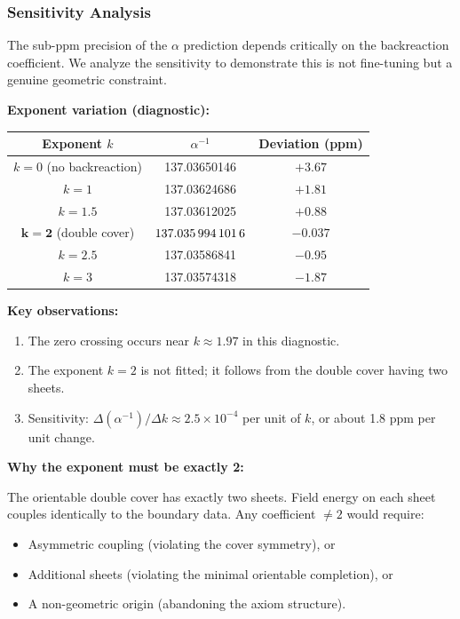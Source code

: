 \TFPTAlphaAuditTable

\subsubsection{Sensitivity Analysis}
\label{sec:sensitivity}

The sub-ppm precision of the $\alpha$ prediction depends critically on the backreaction 
coefficient. We analyze the sensitivity to demonstrate this is not fine-tuning but 
a genuine geometric constraint.

\textbf{Exponent variation (diagnostic):}
\begin{center}
\begin{tabular}{@{}ccc@{}}
\toprule
\textbf{Exponent $k$} & $\alpha^{-1}$ & \textbf{Deviation (ppm)}\\
\midrule
$k = 0$ (no backreaction) & 137.03650146 & $+3.67$\\
$k = 1$ & 137.03624686 & $+1.81$\\
$k = 1.5$ & 137.03612025 & $+0.88$\\
$\mathbf{k = 2}$ (double cover) & $\mathbf{\num[round-mode=places,round-precision=10]{\TFPTalphaInvSelfNum}}$ & $\mathbf{-0.037}$\\
$k = 2.5$ & 137.03586841 & $-0.95$\\
$k = 3$ & 137.03574318 & $-1.87$\\
\bottomrule
\end{tabular}
\end{center}

\textbf{Key observations:}
\begin{enumerate}[leftmargin=1.5em, topsep=2pt, itemsep=1pt]
    \item The zero crossing occurs near $k \approx 1.97$ in this diagnostic.
    \item The exponent $k=2$ is not fitted; it follows from the double cover having two sheets.
    \item Sensitivity: $\Delta(\alpha^{-1})/\Delta k \approx 2.5 \times 10^{-4}$ per unit of $k$, 
        or about 1.8 ppm per unit change.
\end{enumerate}

\textbf{Why the exponent must be exactly 2:}

The orientable double cover has exactly two sheets. Field energy on each sheet couples 
identically to the boundary data. Any coefficient $\neq 2$ would require:
\begin{itemize}[leftmargin=1.5em, topsep=2pt, itemsep=1pt]
    \item Asymmetric coupling (violating the cover symmetry), or
    \item Additional sheets (violating the minimal orientable completion), or
    \item A non-geometric origin (abandoning the axiom structure).
\end{itemize}

